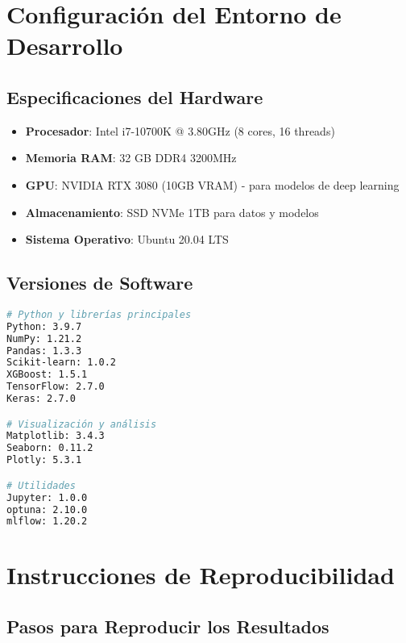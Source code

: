 \section{Configuración del Entorno de Desarrollo}
\label{sec:entorno_desarrollo}

\subsection{Especificaciones del Hardware}
\label{subsec:hardware}

\begin{itemize}
    \item \textbf{Procesador}: Intel i7-10700K @ 3.80GHz (8 cores, 16 threads)
    \item \textbf{Memoria RAM}: 32 GB DDR4 3200MHz
    \item \textbf{GPU}: NVIDIA RTX 3080 (10GB VRAM) - para modelos de deep learning
    \item \textbf{Almacenamiento}: SSD NVMe 1TB para datos y modelos
    \item \textbf{Sistema Operativo}: Ubuntu 20.04 LTS
\end{itemize}

\subsection{Versiones de Software}
\label{subsec:software}

\begin{lstlisting}[language=bash, caption=Versiones de Paquetes Principales]
# Python y librerías principales
Python: 3.9.7
NumPy: 1.21.2
Pandas: 1.3.3
Scikit-learn: 1.0.2
XGBoost: 1.5.1
TensorFlow: 2.7.0
Keras: 2.7.0

# Visualización y análisis
Matplotlib: 3.4.3
Seaborn: 0.11.2
Plotly: 5.3.1

# Utilidades
Jupyter: 1.0.0
optuna: 2.10.0
mlflow: 1.20.2
\end{lstlisting}


\section{Instrucciones de Reproducibilidad}
\label{sec:reproducibilidad}

\subsection{Pasos para Reproducir los Resultados}
\label{subsec:pasos_reproduccion}

